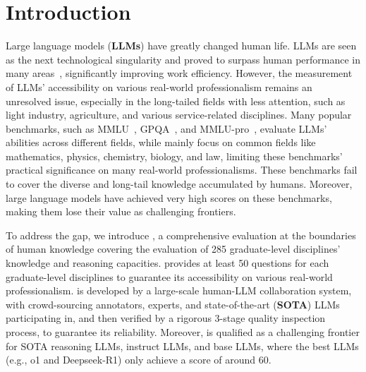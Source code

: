 \section{Introduction}
Large language models (\textbf{LLMs}) have greatly changed human life.
LLMs are seen as the next technological singularity and proved to surpass human performance in many areas~\citep{phan2025hle}, significantly improving work efficiency.
However, the measurement of LLMs' accessibility on various real-world professionalism remains an unresolved issue, especially in the long-tailed fields with less attention, such as light industry, agriculture, and
various service-related disciplines.
Many popular benchmarks, such as MMLU~\citep{hendrycks2020measuring}, GPQA~\citep{rein2023gpqa}, and MMLU-pro~\citep{wang2024mmlupro}, evaluate LLMs' abilities across different fields, while mainly focus on common fields like mathematics, physics, chemistry, biology, and law, limiting these benchmarks' practical significance on many real-world professionalisms.
These benchmarks fail to cover the diverse and long-tail knowledge accumulated by humans.
Moreover, large language models have achieved very high scores on these benchmarks, making them lose their value as challenging frontiers.

To address the gap, we introduce \textbf{\benchmark}, a comprehensive evaluation at the boundaries of human knowledge covering the evaluation of 285 graduate-level disciplines' knowledge and reasoning capacities.
\benchmark provides at least 50 questions for each graduate-level disciplines to guarantee its accessibility on various real-world professionalism.
\benchmark is developed by a large-scale human-LLM collaboration system, with crowd-sourcing annotators, experts, and state-of-the-art (\textbf{SOTA}) LLMs participating in, and then verified by a rigorous 3-stage quality inspection process, to guarantee its reliability.
Moreover, \benchmark is qualified as a challenging frontier for SOTA reasoning LLMs, instruct LLMs, and base LLMs, 
where the best LLMs (e.g., o1 and Deepseek-R1) only achieve a score of around 60.


